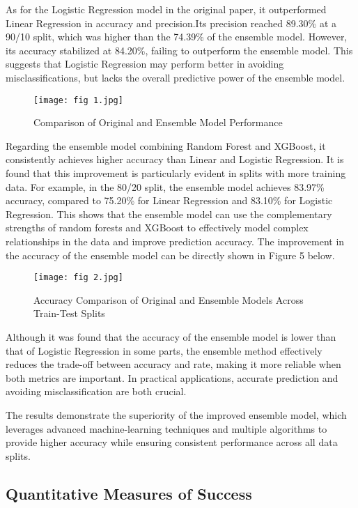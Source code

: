 \documentclass[conference]{IEEEtran}
\begin{document}
As for the Logistic Regression model in the original paper, it outperformed Linear Regression in accuracy and precision.Its precision reached 89.30\% at a 90/10 split, which was higher than the 74.39\% of the ensemble model. However, its accuracy stabilized at 84.20\%, failing to outperform the ensemble model. This suggests that Logistic Regression may perform better in avoiding misclassifications, but lacks the overall predictive power of the ensemble model. 


\begin{figure}[h]
    \centering
    \texttt{[image: fig 1.jpg]}
    \caption{Comparison of Original and Ensemble Model Performance}
    \label{fig:performance-comparison}
\end{figure}


Regarding the ensemble model combining Random Forest and XGBoost, it consistently achieves higher accuracy than Linear and Logistic Regression. It is found that this improvement is particularly evident in splits with more training data. For example, in the 80/20 split, the ensemble model achieves 83.97\% accuracy, compared to 75.20\% for Linear Regression and 83.10\% for Logistic Regression. This shows that the ensemble model can use the complementary strengths of random forests and XGBoost to effectively model complex relationships in the data and improve prediction accuracy. The improvement in the accuracy of the ensemble model can be directly shown in Figure 5 below.

\begin{figure}[h]
    \centering
    \texttt{[image: fig 2.jpg]}
    \caption{Accuracy Comparison of Original and Ensemble Models Across Train-Test Splits}
    \label{fig:accuracy-comparison}
\end{figure}

Although it was found that the accuracy of the ensemble model is lower than that of Logistic Regression in some parts, the ensemble method effectively reduces the trade-off between accuracy and rate, making it more reliable when both metrics are important. In practical applications, accurate prediction and avoiding misclassification are both crucial.

The results demonstrate the superiority of the improved ensemble model, which leverages advanced machine-learning techniques and multiple algorithms to provide higher accuracy while ensuring consistent performance across all data splits.

\subsection{Quantitative Measures of Success}
\end{document}
